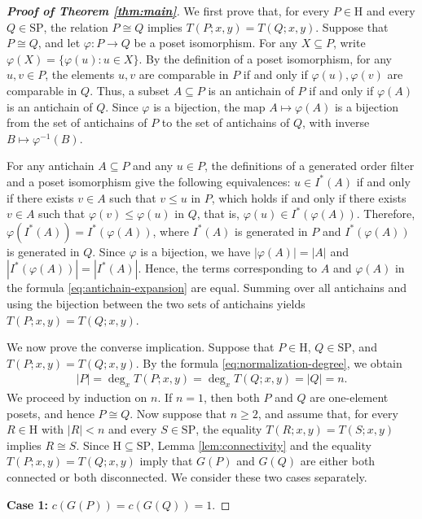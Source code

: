 \documentclass[10pt,a4paper]{amsart}
\begin{document}
\begin{proof}[\rm\textbf{Proof of Theorem \ref{thm:main}}]
We first prove that, for every $P\in\mathrm H$ and every
$Q\in\mathrm{SP}$, the relation $P\cong Q$ implies $T(P;x,y)=T(Q;x,y)$.
Suppose that $P\cong Q$, and let $\varphi:P\to Q$ be a poset isomorphism.
For any $X\subseteq P$, write $\varphi(X)=\{\varphi(u):u\in X\}$.
By the definition of a poset isomorphism, for any $u,v\in P$,
the elements $u,v$ are comparable in $P$ if and only if
$\varphi(u),\varphi(v)$ are comparable in $Q$.
Thus, a subset $A\subseteq P$ is an antichain of $P$ if and only if
$\varphi(A)$ is an antichain of $Q$.
Since $\varphi$ is a bijection, the map $A\mapsto\varphi(A)$
is a bijection from the set of antichains of $P$ to the set
of antichains of $Q$, with inverse $B\mapsto\varphi^{-1}(B)$.

For any antichain $A\subseteq P$ and any $u\in P$,
the definitions of a generated order filter and a poset isomorphism
give the following equivalences:
$u\in I^*(A)$ if and only if there exists $v\in A$ such that
$v\le u$ in $P$, which holds if and only if there exists $v\in A$
such that $\varphi(v)\le\varphi(u)$ in $Q$, that is, $\varphi(u)\in I^*(\varphi(A))$.
Therefore, $\varphi(I^*(A))=I^*(\varphi(A))$, where $I^*(A)$ is generated in $P$ and
$I^*(\varphi(A))$ is generated in $Q$. Since $\varphi$ is a bijection, we have
$|\varphi(A)|=|A|$ and $|I^*(\varphi(A))|=|I^*(A)|$.
Hence, the terms corresponding to $A$ and $\varphi(A)$ in the formula \eqref{eq:antichain-expansion} are equal.
Summing over all antichains and using the bijection between the two sets of antichains yields $T(P;x,y)=T(Q;x,y)$.

We now prove the converse implication.
Suppose that $P\in\mathrm H$, $Q\in\mathrm{SP}$, and $T(P;x,y)=T(Q;x,y)$.
By the formula \eqref{eq:normalization-degree}, we obtain
\begin{eqnarray*}
|P|=\deg_x T(P;x,y)=\deg_x T(Q;x,y)=|Q|=n.
\end{eqnarray*}
We proceed by induction on $n$.
If $n=1$, then both $P$ and $Q$ are one-element posets,
and hence $P\cong Q$.
Now suppose that $n\geq2$, and assume that, for every
$R\in\mathrm H$ with $|R|<n$ and every $S\in\mathrm{SP}$,
the equality $T(R;x,y)=T(S;x,y)$ implies $R\cong S$.
Since $\mathrm H\subseteq\mathrm{SP}$,
Lemma \ref{lem:connectivity} and the equality
$T(P;x,y)=T(Q;x,y)$ imply that $G(P)$ and $G(Q)$
are either both connected or both disconnected.
We consider these two cases separately.

\textbf{Case 1:} $c(G(P))=c(G(Q))=1$.


\end{proof}
\end{document}
